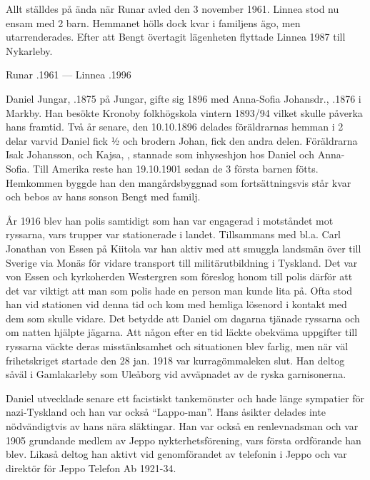 Allt ställdes på ända när Runar avled den 3 november 1961. Linnea stod nu ensam med 2 barn. Hemmanet hölls dock kvar i familjens ägo, men utarrenderades. Efter att Bengt övertagit lägenheten flyttade Linnea 1987 till Nykarleby.
\begin{jhchildren}
  \item {}
  \item {}
\end{jhchildren}

Runar .1961  ---  Linnea .1996



Daniel Jungar, .1875 på Jungar, gifte sig 1896 med Anna-Sofia Johansdr., .1876 i Markby. Han besökte Kronoby folkhögskola vintern 1893/94 vilket skulle påverka hans framtid. Två år senare, den 10.10.1896 delades föräldrarnas hemman i 2 delar varvid Daniel fick ½ och brodern Johan,  fick den andra delen. Föräldrarna Isak Johansson,  och Kajsa, , stannade som inhyseshjon hos Daniel och Anna-Sofia. Till Amerika reste han 19.10.1901 sedan de 3 första barnen fötts. Hemkommen byggde han den mangårdsbyggnad som fortsättningsvis står kvar och bebos av hans sonson Bengt med familj.

År 1916 blev han polis samtidigt som han var engagerad i motståndet mot ryssarna, vars trupper var stationerade i landet. Tillsammans med bl.a. Carl Jonathan von Essen på Kiitola var han aktiv med att smuggla landsmän över till Sverige via Monäs för vidare transport till militärutbildning i Tyskland. Det var von Essen och kyrkoherden Westergren som föreslog honom till polis därför att det var viktigt att man som polis hade en person man kunde lita på. Ofta stod han vid stationen vid denna tid och kom med hemliga lösenord i kontakt med dem som skulle vidare. Det betydde att Daniel om dagarna tjänade ryssarna och om natten hjälpte jägarna. Att någon efter en tid läckte obekväma uppgifter till ryssarna väckte deras misstänksamhet och situationen blev farlig, men när väl frihetskriget startade den 28 jan. 1918 var kurragömmaleken slut. Han deltog såväl i Gamlakarleby som Uleåborg vid avväpnadet av de ryska garnisonerna.

Daniel utvecklade senare ett facistiskt tankemönster och hade länge sympatier för nazi-Tyskland och han var också ``Lappo-man''. Hans åsikter delades inte nödvändigtvis av hans nära släktingar. Han var också en renlevnadsman och var 1905 grundande medlem av Jeppo nykterhetsförening, vars första ordförande han blev. Likaså deltog han aktivt vid genomförandet av telefonin i Jeppo och var direktör för Jeppo Telefon Ab 1921-34.

